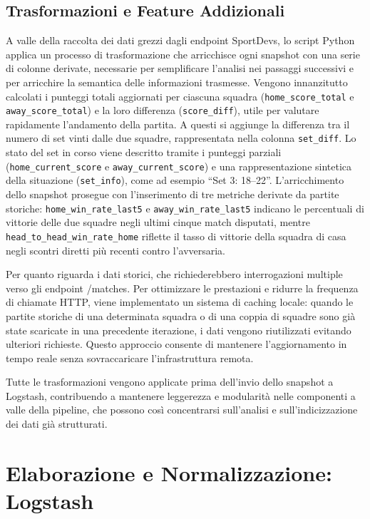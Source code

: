 \documentclass[a4paper,12pt]{report}
\begin{document}
\subsection{Trasformazioni e Feature Addizionali}

A valle della raccolta dei dati grezzi dagli endpoint SportDevs, lo script Python applica un processo di trasformazione che arricchisce ogni snapshot con una serie di colonne derivate, necessarie per semplificare l’analisi nei passaggi successivi e per arricchire la semantica delle informazioni trasmesse.
Vengono innanzitutto calcolati i punteggi totali aggiornati per ciascuna squadra (\texttt{home\_score\_total} e \texttt{away\_score\_total}) e la loro differenza (\texttt{score\_diff}), utile per valutare rapidamente l’andamento della partita. A questi si aggiunge la differenza tra il numero di set vinti dalle due squadre, rappresentata nella colonna \texttt{set\_diff}. Lo stato del set in corso viene descritto tramite i punteggi parziali (\texttt{home\_current\_score} e \texttt{away\_current\_score}) e una rappresentazione sintetica della situazione (\texttt{set\_info}), come ad esempio ``Set 3: 18--22''.
L’arricchimento dello snapshot prosegue con l’inserimento di tre metriche derivate da partite storiche: \texttt{home\_win\_rate\_last5} e \texttt{away\_win\_rate\_last5} indicano le percentuali di vittorie delle due squadre negli ultimi cinque match disputati, mentre \texttt{head\_to\_head\_win\_rate\_home} riflette il tasso di vittorie della squadra di casa negli scontri diretti più recenti contro l’avversaria.

Per quanto riguarda i dati storici, che richiederebbero interrogazioni multiple verso gli endpoint /matches. Per ottimizzare le prestazioni e ridurre la frequenza di chiamate HTTP, viene implementato un sistema di caching locale: quando le partite storiche di una determinata squadra o di una coppia di squadre sono già state scaricate in una precedente iterazione, i dati vengono riutilizzati evitando ulteriori richieste. Questo approccio consente di mantenere l’aggiornamento in tempo reale senza sovraccaricare l’infrastruttura remota.

Tutte le trasformazioni vengono applicate prima dell’invio dello snapshot a Logstash, contribuendo a mantenere leggerezza e modularità nelle componenti a valle della pipeline, che possono così concentrarsi sull’analisi e sull’indicizzazione dei dati già strutturati.

\section{Elaborazione e Normalizzazione: Logstash}
\end{document}
